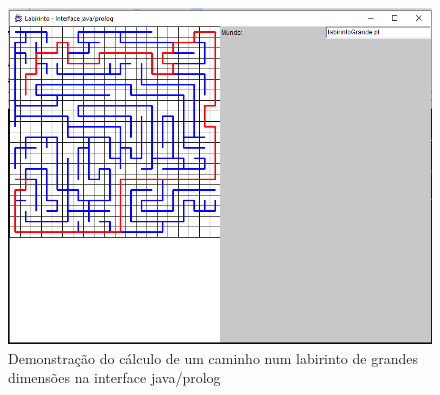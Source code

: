 \documentclass[11pt]{report}
\begin{document}
\begin{figure}[!htb]
	\includegraphics[width=\linewidth]{img/labGrande}
	\caption{Demonstração do cálculo de um caminho num labirinto de grandes dimensões na interface java/prolog}
	\label{fig:ping}
\end{figure}
\end{document}
